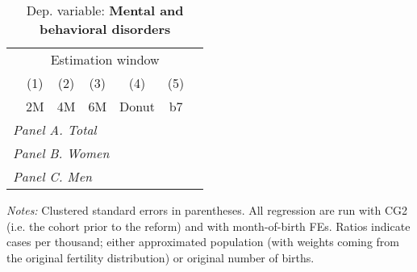 \begin{table}[htbp] \centering \begin{threeparttable} \centering \caption{Dep. variable: \textbf{Mental and behavioral disorders}} {\def\sym#1{\ifmmode^{#1}\else\(^{#1}\)\fi} \begin{tabular}{l*{6}{c}} \toprule & \multicolumn{5}{c}{Estimation window} \\ \cmidrule(lr){2-5}
            &\multicolumn{1}{c}{(1)}&\multicolumn{1}{c}{(2)}&\multicolumn{1}{c}{(3)}&\multicolumn{1}{c}{(4)}&\multicolumn{1}{c}{(5)}\\
            &\multicolumn{1}{c}{2M}&\multicolumn{1}{c}{4M}&\multicolumn{1}{c}{6M}&\multicolumn{1}{c}{Donut}&\multicolumn{1}{c}{b7}\\
\midrule
 \multicolumn{6}{l}{\emph{Panel A. Total}} \\      \midrule\multicolumn{6}{l}{\emph{Panel B. Women}} \\      \midrule\multicolumn{6}{l}{\emph{Panel C. Men}} \\      
\bottomrule \end{tabular} } \begin{tablenotes} \item \scriptsize \emph{Notes:} Clustered standard errors in parentheses. All regression are run with CG2 (i.e. the cohort prior to the reform) and with month-of-birth FEs. Ratios indicate cases per thousand; either approximated population (with weights coming from the original fertility distribution) or original number of births. \end{tablenotes} \end{threeparttable} \end{table} 
